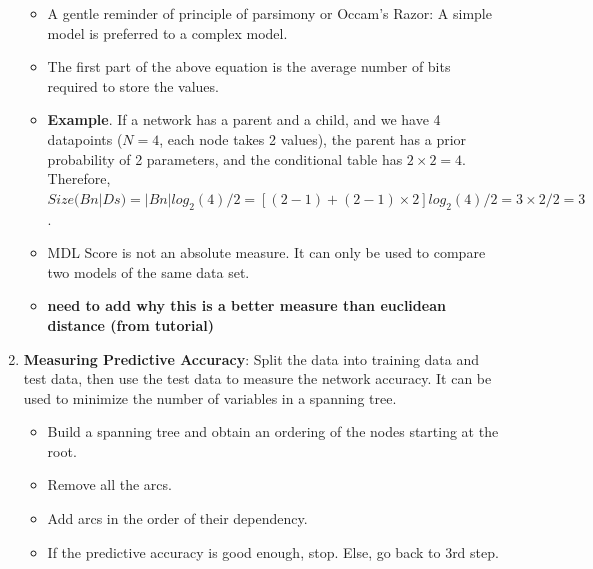 \documentclass[12pt,twoside]{article}
\begin{document}
\begin{enumerate}
        \begin{itemize}
        	\item A gentle reminder of principle of parsimony or Occam's Razor: A simple model is preferred to a complex model. 
        	\item The first part of the above equation is the average number of bits required to store the values. 
            \item \textbf{Example}. If a network has a parent and a child, and we have 4 datapoints ($N=4$, each node takes 2 values), the parent has a prior probability of 2 parameters, and the conditional table has $2\times2 =4 $. Therefore, $Size(Bn|Ds) = |Bn|log_2(4)/2 = [(2-1) + (2-1)\times2]log_2(4)/2  = 3 \times 2/2 = 3$.
            \item MDL Score is not an absolute measure. It can only be used to compare two models of the same data set.
            \item \textbf{need to add why this is a better measure than euclidean distance (from tutorial)}
        \end{itemize}
               
        
	\item \textbf{Measuring Predictive Accuracy}: Split the data into training data and test data, then use the test data to measure the network accuracy. It can be used to minimize the number of variables in a spanning tree.
		\begin{itemize}
			\item Build a spanning tree and obtain an ordering of the nodes starting at the root.
			\item Remove all the arcs.
			\item Add arcs in the order of their dependency.
			\item If the predictive accuracy is good enough, stop. Else, go back to 3rd step.
		\end{itemize}			
	
\end{enumerate}


\newpage
\end{document}

